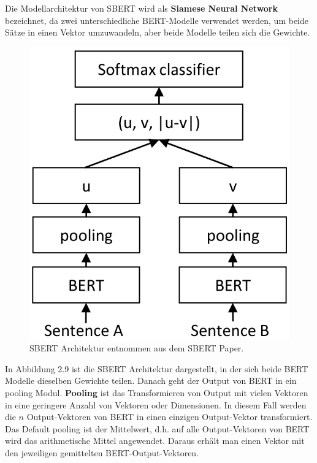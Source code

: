 \documentclass[12pt,letterpaper,ngerman]{article}
\begin{document}
Die Modellarchitektur von SBERT wird als {\bf Siamese Neural Network }
bezeichnet, da zwei unterschiedliche BERT-Modelle verwendet werden,
um beide Sätze in einen Vektor umzuwandeln, aber beide Modelle teilen 
sich die Gewichte.
\pagebreak

\begin{figure}[H]
  \begin{center}
    \includegraphics[scale=0.3]{abb/SBERT.png}
  \end{center}
  \caption{SBERT Architektur entnommen aus dem SBERT Paper.}
\end{figure}
In Abbildung 2.9 ist die SBERT Architektur dargestellt, 
in der sich beide BERT Modelle dieselben Gewichte teilen. 
Danach geht der Output von BERT in ein pooling Modul. 
{\bf Pooling} ist das Transformieren von Output mit vielen Vektoren 
in eine geringere Anzahl von Vektoren oder Dimensionen. In diesem Fall 
werden die $n$ Output-Vektoren von BERT in einen einzigen Output-Vektor 
transformiert. Das Default pooling ist der Mittelwert, d.h. auf alle 
Output-Vektoren von BERT wird das arithmetische Mittel angewendet.
Daraus erhält man einen Vektor mit den jeweiligen gemittelten 
BERT-Output-Vektoren.\\
\end{document}
